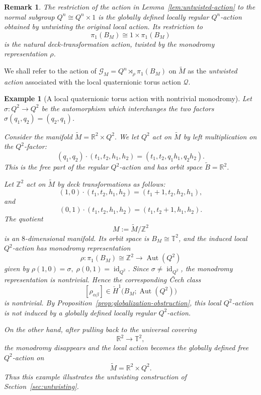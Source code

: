 \documentclass[11pt,a4paper]{article}
\numberwithin{equation}{section}
\newtheorem{remark}[definition]{Remark}
\newtheorem{example}[definition]{Example}
\theoremstyle{named}
\begin{document}
\begin{remark}
The restriction of the action in Lemma~\ref{lem:untwisted-action} to the normal subgroup $Q^n\cong Q^n\times{1}$
is the globally defined locally regular \(Q^n\)-action obtained by untwisting the original local action. Its restriction to
\[
\pi_1(B_M)\cong{1}\times\pi_1(B_M)
\]
is the natural deck-transformation action, twisted by the monodromy representation \(\rho\).
\end{remark}

\begin{definition}\label{def:untwisted-action}
We shall refer to the action of $\mathcal G_M=Q^n\rtimes_\rho\pi_1(B_M)$ on \(\widetilde M\) as the \emph{untwisted action} associated with the local quaternionic torus action \(\mathcal Q\).
\end{definition}

\begin{example}[A local quaternionic torus action with nontrivial monodromy]
\label{ex:local-quaternionic-nonglobal}
Let \(\sigma:Q^2\longrightarrow Q^2\) be the automorphism which interchanges the two factors \(\sigma(q_1,q_2)=(q_2,q_1)\).

Consider the manifold \(\widetilde M=\mathbb R^2\times Q^2.\) We let \(Q^2\) act on \(\widetilde M\) by left multiplication on the \(Q^2\)-factor:
\[
(q_1,q_2)\cdot(t_1,t_2,h_1,h_2)
=
(t_1,t_2,q_1h_1,q_2h_2).
\]
This is the free part of the regular \(Q^2\)-action and has orbit space \(\widetilde B=\mathbb R^2\).

Let \(\mathbb Z^2\) act on \(\widetilde M\) by deck transformations as
follows:
\[
(1,0)\cdot(t_1,t_2,h_1,h_2)
=
(t_1+1,t_2,h_2,h_1),
\]
and
\[
(0,1)\cdot(t_1,t_2,h_1,h_2)
=
(t_1,t_2+1,h_1,h_2).
\]
The quotient
\[
M:=\widetilde M/\mathbb Z^2
\]
is an \(8\)-dimensional manifold. Its orbit space is $B_M\cong \mathbb T^2$,
and the induced local \(Q^2\)-action has monodromy representation
\[
\rho:\pi_1(B_M)\cong\mathbb Z^2
\longrightarrow
\operatorname{Aut}(Q^2)
\]
given by
$\rho(1,0)=\sigma,
\;
\rho(0,1)=\operatorname{id}_{Q^2}$. Since \(\sigma\neq\operatorname{id}_{Q^2}\), the monodromy representation is nontrivial. Hence the corresponding \v{C}ech class
\[
[\rho_{\alpha\beta}]
\in
\check H^1\bigl(B_M;\operatorname{Aut}(Q^2)\bigr)
\]
is nontrivial. By Proposition~\ref{prop:globalization-obstruction}, this local \(Q^2\)-action is not induced by a globally defined locally regular \(Q^2\)-action.

On the other hand, after pulling back to the universal covering
\[
\mathbb R^2\longrightarrow\mathbb T^2,
\]
the monodromy disappears and the local action becomes the globally defined
free \(Q^2\)-action on
\[
\widetilde M=\mathbb R^2\times Q^2.
\]
Thus this example illustrates the untwisting construction of Section~\ref{sec:untwisting}.
\end{example}
\end{document}
